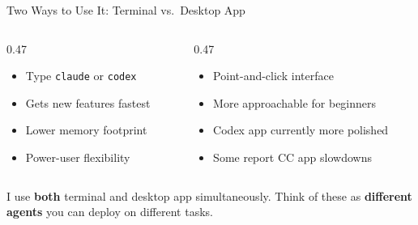 \documentclass[aspectratio=169, 10pt]{beamer}
\begin{document}
\begin{frame}{Two Ways to Use It: Terminal vs.\ Desktop App}
\begin{columns}[T]
\begin{column}{0.47\textwidth}
\begin{tcolorbox}[keybox, title={\faTerminal\quad Terminal (CLI)}]
\scriptsize
\begin{itemize}\setlength{\itemsep}{1pt}
  \item Type \texttt{claude} or \texttt{codex}
  \item Gets new features fastest
  \item Lower memory footprint
  \item Power-user flexibility
\end{itemize}
\end{tcolorbox}
\end{column}
\begin{column}{0.47\textwidth}
\begin{tcolorbox}[keybox, title={\faDesktop\quad Desktop App}]
\scriptsize
\begin{itemize}\setlength{\itemsep}{1pt}
  \item Point-and-click interface
  \item More approachable for beginners
  \item Codex app currently more polished
  \item Some report CC app slowdowns
\end{itemize}
\end{tcolorbox}
\end{column}
\end{columns}
\vskip6pt
\pause
\begin{tcolorbox}[quotebox, width=12cm]
\scriptsize I use \textbf{both} terminal and desktop app simultaneously. Think of these as \textbf{different agents} you can deploy on different tasks.
\end{tcolorbox}
\end{frame}
\end{document}

